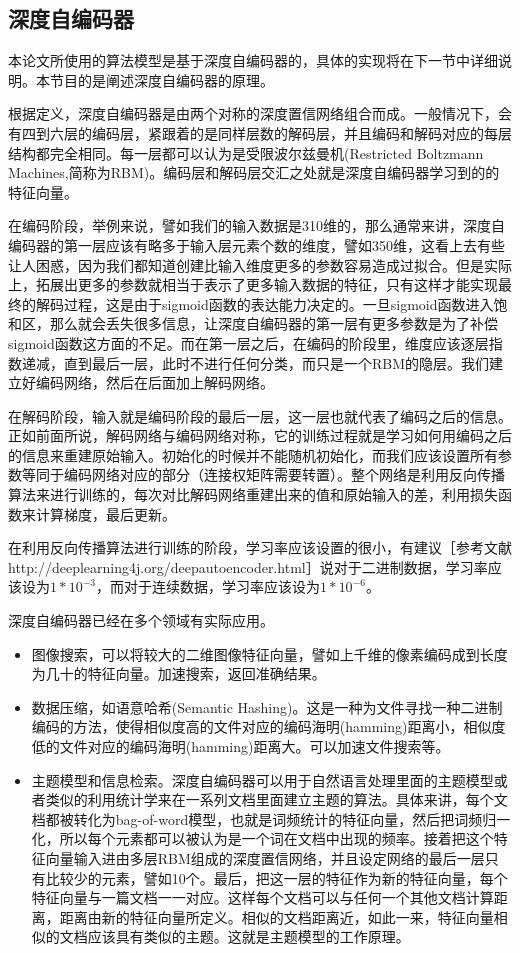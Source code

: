 \subsection{深度自编码器}{
	本论文所使用的算法模型是基于深度自编码器的，具体的实现将在下一节中详细说明。本节目的是阐述深度自编码器的原理。
	
	根据定义，深度自编码器是由两个对称的深度置信网络组合而成。一般情况下，会有四到六层的编码层，紧跟着的是同样层数的解码层，并且编码和解码对应的每层结构都完全相同。每一层都可以认为是受限波尔兹曼机(Restricted Boltzmann Machines,简称为RBM)。编码层和解码层交汇之处就是深度自编码器学习到的的特征向量。
	
	
	在编码阶段，举例来说，譬如我们的输入数据是310维的，那么通常来讲，深度自编码器的第一层应该有略多于输入层元素个数的维度，譬如350维，这看上去有些让人困惑，因为我们都知道创建比输入维度更多的参数容易造成过拟合。但是实际上，拓展出更多的参数就相当于表示了更多输入数据的特征，只有这样才能实现最终的解码过程，这是由于sigmoid函数的表达能力决定的。一旦sigmoid函数进入饱和区，那么就会丢失很多信息，让深度自编码器的第一层有更多参数是为了补偿sigmoid函数这方面的不足。而在第一层之后，在编码的阶段里，维度应该逐层指数递减，直到最后一层，此时不进行任何分类，而只是一个RBM的隐层。我们建立好编码网络，然后在后面加上解码网络。
	
	在解码阶段，输入就是编码阶段的最后一层，这一层也就代表了编码之后的信息。正如前面所说，解码网络与编码网络对称，它的训练过程就是学习如何用编码之后的信息来重建原始输入。初始化的时候并不能随机初始化，而我们应该设置所有参数等同于编码网络对应的部分（连接权矩阵需要转置）。整个网络是利用反向传播算法来进行训练的，每次对比解码网络重建出来的值和原始输入的差，利用损失函数来计算梯度，最后更新。
	
	在利用反向传播算法进行训练的阶段，学习率应该设置的很小，有建议［参考文献http://deeplearning4j.org/deepautoencoder.html］说对于二进制数据，学习率应该设为$1 * 10^{-3}$，而对于连续数据，学习率应该设为$1 * 10^{-6}$。
	
	深度自编码器已经在多个领域有实际应用。
	\begin{itemize}
	\item 图像搜索，可以将较大的二维图像特征向量，譬如上千维的像素编码成到长度为几十的特征向量。加速搜索，返回准确结果。
	\item 数据压缩，如语意哈希(Semantic Hashing)。这是一种为文件寻找一种二进制编码的方法，使得相似度高的文件对应的编码海明(hamming)距离小，相似度低的文件对应的编码海明(hamming)距离大。可以加速文件搜索等。
	\item 主题模型和信息检索。深度自编码器可以用于自然语言处理里面的主题模型或者类似的利用统计学来在一系列文档里面建立主题的算法。具体来讲，每个文档都被转化为bag-of-word模型，也就是词频统计的特征向量，然后把词频归一化，所以每个元素都可以被认为是一个词在文档中出现的频率。接着把这个特征向量输入进由多层RBM组成的深度置信网络，并且设定网络的最后一层只有比较少的元素，譬如10个。最后，把这一层的特征作为新的特征向量，每个特征向量与一篇文档一一对应。这样每个文档可以与任何一个其他文档计算距离，距离由新的特征向量所定义。相似的文档距离近，如此一来，特征向量相似的文档应该具有类似的主题。这就是主题模型的工作原理。
	\end{itemize}
}
